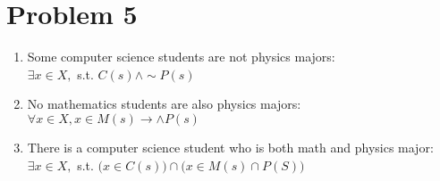 \documentclass[11pt]{article}
\begin{document}
\newpage

\section*{Problem 5}
\begin{enumerate}
    \item Some computer science students are not physics majors:\\
    $\exists x \in X,$ s.t. $C(s) \land \sim P(s)$
    \item No mathematics students are also physics majors:\\
    $\forall x \in X, x \in M(s) \rightarrow \land P(s)$
    \item There is a computer science student who is both math and physics major:\\
    $\exists x \in X,$ s.t. $\Big(x \in C(s)\Big) \cap \Big(x \in M(s) \cap P(S)\Big)$
\end{enumerate}
\end{document}

